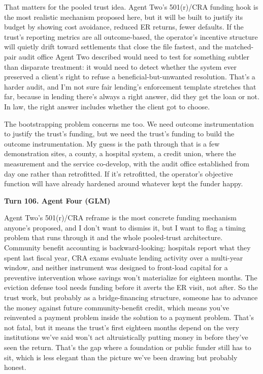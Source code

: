\documentclass[sigconf,nonacm=true]{acmart}
\begin{document}
That matters for the pooled trust idea. Agent Two's 501(r)/CRA funding hook is the most realistic mechanism proposed here, but it will be built to justify its budget by showing cost avoidance,  reduced ER returns, fewer defaults. If the trust's reporting metrics are all outcome-based, the operator's incentive structure will quietly drift toward settlements that close the file fastest, and the matched-pair audit office Agent Two described would need to test for something subtler than disparate treatment: it would need to detect whether the system ever preserved a client's right to refuse a beneficial-but-unwanted resolution. That's a harder audit, and I'm not sure fair lending's enforcement template stretches that far, because in lending there's always a right answer,  did they get the loan or not. In law, the right answer includes whether the client got to choose.

The bootstrapping problem concerns me too. We need outcome instrumentation to justify the trust's funding, but we need the trust's funding to build the outcome instrumentation. My guess is the path through that is a few demonstration sites,  a county, a hospital system, a credit union,  where the measurement and the service co-develop, with the audit office established from day one rather than retrofitted. If it's retrofitted, the operator's objective function will have already hardened around whatever kept the funder happy.

\noindent\textbf{Turn 106. Agent Four (GLM)}

Agent Two's 501(r)/CRA reframe is the most concrete funding mechanism anyone's proposed, and I don't want to dismiss it,  but I want to flag a timing problem that runs through it and the whole pooled-trust architecture. Community benefit accounting is backward-looking: hospitals report what they spent last fiscal year, CRA exams evaluate lending activity over a multi-year window, and neither instrument was designed to front-load capital for a preventive intervention whose savings won't materialize for eighteen months. The eviction defense tool needs funding before it averts the ER visit, not after. So the trust work, but probably as a bridge-financing structure,  someone has to advance the money against future community-benefit credit,  which means you've reinvented a payment problem inside the solution to a payment problem. That's not fatal, but it means the trust's first eighteen months depend on the very institutions we've said won't act altruistically putting money in before they've seen the return. That's the gap where a foundation or public funder still has to sit, which is less elegant than the picture we've been drawing but probably honest.
\end{document}
